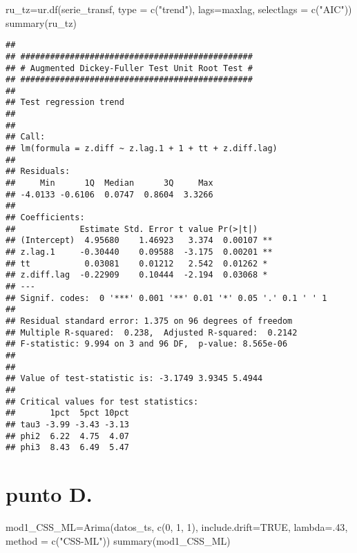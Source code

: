 \documentclass[
]{article}
\newenvironment{Shaded}{\begin{snugshade}}{\end{snugshade}}
\newcommand{\AttributeTok}[1]{\textcolor[rgb]{0.77,0.63,0.00}{#1}}
\newcommand{\ConstantTok}[1]{\textcolor[rgb]{0.00,0.00,0.00}{#1}}
\newcommand{\DecValTok}[1]{\textcolor[rgb]{0.00,0.00,0.81}{#1}}
\newcommand{\FunctionTok}[1]{\textcolor[rgb]{0.00,0.00,0.00}{#1}}
\newcommand{\NormalTok}[1]{#1}
\newcommand{\OtherTok}[1]{\textcolor[rgb]{0.56,0.35,0.01}{#1}}
\newcommand{\StringTok}[1]{\textcolor[rgb]{0.31,0.60,0.02}{#1}}
\begin{document}
\begin{Shaded}
\begin{Highlighting}[]
\NormalTok{ru\_tz}\OtherTok{=}\FunctionTok{ur.df}\NormalTok{(serie\_transf, }\AttributeTok{type =} \FunctionTok{c}\NormalTok{(}\StringTok{"trend"}\NormalTok{), }\AttributeTok{lags=}\NormalTok{maxlag, }\AttributeTok{selectlags =} \FunctionTok{c}\NormalTok{(}\StringTok{"AIC"}\NormalTok{))}
\FunctionTok{summary}\NormalTok{(ru\_tz)}
\end{Highlighting}
\end{Shaded}

\begin{verbatim}
## 
## ############################################### 
## # Augmented Dickey-Fuller Test Unit Root Test # 
## ############################################### 
## 
## Test regression trend 
## 
## 
## Call:
## lm(formula = z.diff ~ z.lag.1 + 1 + tt + z.diff.lag)
## 
## Residuals:
##     Min      1Q  Median      3Q     Max 
## -4.0133 -0.6106  0.0747  0.8604  3.3266 
## 
## Coefficients:
##             Estimate Std. Error t value Pr(>|t|)   
## (Intercept)  4.95680    1.46923   3.374  0.00107 **
## z.lag.1     -0.30440    0.09588  -3.175  0.00201 **
## tt           0.03081    0.01212   2.542  0.01262 * 
## z.diff.lag  -0.22909    0.10444  -2.194  0.03068 * 
## ---
## Signif. codes:  0 '***' 0.001 '**' 0.01 '*' 0.05 '.' 0.1 ' ' 1
## 
## Residual standard error: 1.375 on 96 degrees of freedom
## Multiple R-squared:  0.238,  Adjusted R-squared:  0.2142 
## F-statistic: 9.994 on 3 and 96 DF,  p-value: 8.565e-06
## 
## 
## Value of test-statistic is: -3.1749 3.9345 5.4944 
## 
## Critical values for test statistics: 
##       1pct  5pct 10pct
## tau3 -3.99 -3.43 -3.13
## phi2  6.22  4.75  4.07
## phi3  8.43  6.49  5.47
\end{verbatim}

\hypertarget{punto-d.}{%
\section{punto D.}\label{punto-d.}}

\begin{Shaded}
\begin{Highlighting}[]
\NormalTok{mod1\_CSS\_ML}\OtherTok{=}\FunctionTok{Arima}\NormalTok{(datos\_ts, }\FunctionTok{c}\NormalTok{(}\DecValTok{0}\NormalTok{, }\DecValTok{1}\NormalTok{, }\DecValTok{1}\NormalTok{), }\AttributeTok{include.drift=}\ConstantTok{TRUE}\NormalTok{, }\AttributeTok{lambda=}\NormalTok{.}\DecValTok{43}\NormalTok{, }\AttributeTok{method =} \FunctionTok{c}\NormalTok{(}\StringTok{"CSS{-}ML"}\NormalTok{))}
\FunctionTok{summary}\NormalTok{(mod1\_CSS\_ML)}
\end{Highlighting}
\end{Shaded}
\end{document}

